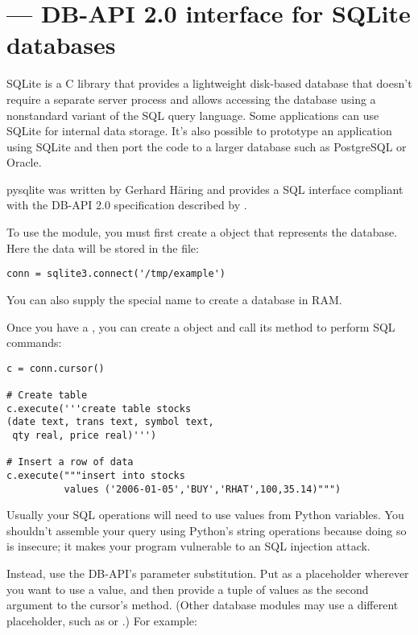 \section{ ---
         DB-API 2.0 interface for SQLite databases}


SQLite is a C library that provides a lightweight disk-based database
that doesn't require a separate server process and allows accessing
the database using a nonstandard variant of the SQL query language.
Some applications can use SQLite for internal data storage.  It's also
possible to prototype an application using SQLite and then port the
code to a larger database such as PostgreSQL or Oracle.
 
pysqlite was written by Gerhard H\"aring and provides a SQL interface
compliant with the DB-API 2.0 specification described by
. 

To use the module, you must first create a  object
that represents the database.  Here the data will be stored in the 
 file:

\begin{verbatim}
conn = sqlite3.connect('/tmp/example')
\end{verbatim}

You can also supply the special name  to create
a database in RAM.

Once you have a , you can create a  
object and call its  method to perform SQL commands:

\begin{verbatim}
c = conn.cursor()

# Create table
c.execute('''create table stocks
(date text, trans text, symbol text,
 qty real, price real)''')

# Insert a row of data
c.execute("""insert into stocks
          values ('2006-01-05','BUY','RHAT',100,35.14)""")
\end{verbatim}    

Usually your SQL operations will need to use values from Python
variables.  You shouldn't assemble your query using Python's string
operations because doing so is insecure; it makes your program
vulnerable to an SQL injection attack.  

Instead, use the DB-API's parameter substitution.  Put  as a
placeholder wherever you want to use a value, and then provide a tuple
of values as the second argument to the cursor's 
method.  (Other database modules may use a different placeholder,
such as  or .) For example:

